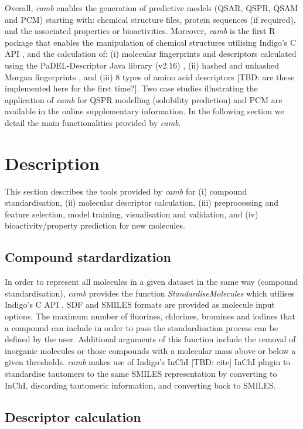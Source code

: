 \documentclass{bioinfo}
\begin{document}
Overall, {\it camb} enables the generation of predictive  models (QSAR, QSPR, QSAM and PCM)
starting with: chemical structure files, protein sequences (if required), and the associated properties or bioactivities.
Moreover, {\it camb} is the first R package that enables the manipulation of chemical structures utilising Indigo's C API \citep{Indigo},
and the calculation of:
(i) molecular fingerprints and descriptors calculated using the PaDEL-Descriptor Java library (v2.16) \citep{padel},
(ii) hashed and unhashed Morgan fingerprints \citep{extended_fp},
and (iii) 8 types of amino acid descriptors [TBD: are these implemented here for the first time?]. 
Two case studies illustrating the application of {\it camb} for
QSPR modelling (solubility prediction) and PCM are available in the online supplementary information.
In the following section we detail the main functionalities provided by {\it camb}. 

\section{Description}
This section describes the tools provided by {\it camb} 
for (i) compound standardisation, (ii) molecular descriptor calculation, 
(iii) preprocessing and feature selection, model training, visualisation and validation, and (iv) bioactivity/property prediction for new molecules.	

\subsection{Compound stardardization}

In order to represent all molecules in a given dataset in the same 
way (compound standardisation),
{\it camb}  provides the function {\it StandardiseMolecules} which utilises Indigo's C API \citep{Indigo}.
SDF and SMILES formats are provided as molecule input options.
The maximum number of fluorines, chlorines, bromines and iodines
that a compound can include in order to pass the standardisation process can be defined by the user.
Additional arguments of this function include the removal of inorganic molecules
or those compounds with a molecular mass above or below a given thresholds.
{\it camb} makes use of Indigo's InChI [TBD: cite] InChI plugin to standardise tautomers to the same SMILES representation
by converting to InChI, discarding tautomeric information, and converting back to SMILES.

\subsection{Descriptor calculation} 
\end{document}
